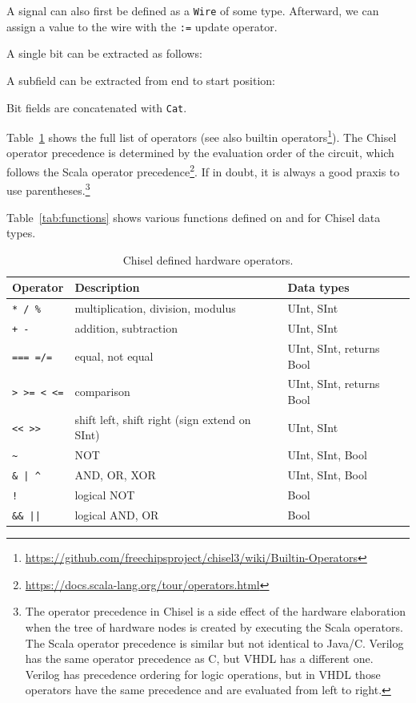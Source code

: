 \documentclass[%
    10pt,
    headinclude, footexclude,
    openright, %
    notitlepage,
    cleardoubleempty,
    headsepline,
    pointlessnumbers,
    bibtotoc, idxtotoc,
    ]{scrbook}
\newcommand{\code}[1]{{\small{\texttt{#1}}}}
\newcommand{\myref}[2]{\href{#1}{#2}}
\renewcommand{\myref}[2]{{#2}{\footnote{\url{#1}}}}
\begin{document}
A signal can also first be defined as a \code{Wire} of some type. Afterward, we can assign a
value to the wire with the \code{:=} update operator.


A single bit can be extracted as follows:

\noindent A subfield can be extracted from end to start position:

\noindent Bit fields are concatenated with \code{Cat}.

Table~\ref{tab:operators} shows the full list of operators
(see also \myref{https://github.com/freechipsproject/chisel3/wiki/Builtin-Operators}{builtin operators}).
The Chisel operator precedence is determined by the evaluation order of the circuit,
which follows the \myref{https://docs.scala-lang.org/tour/operators.html}{Scala operator precedence}.
If in doubt, it is always a good praxis to use parentheses.\footnote{The operator precedence in
Chisel is a side effect of the hardware elaboration when the tree of hardware nodes
is created by executing the Scala operators. The Scala operator precedence is similar but
not identical to Java/C. Verilog has the same operator precedence as C, but VHDL
has a different one. Verilog has precedence ordering for logic operations, but in VHDL
those operators have the same precedence and are evaluated from left to right.}

Table~\ref{tab:functions} shows various functions defined on and for Chisel data types.

\begin{table}
 \centering
 \label{tab:operators}
  \begin{tabular}{lll}
    \toprule
    Operator & Description & Data types \\
    \midrule
    \code{* / \%} & multiplication, division, modulus & UInt, SInt \\
    \code{+ -} & addition, subtraction & UInt, SInt \\
    \code{=== =/=} & equal, not equal & UInt, SInt, returns Bool \\
    \code{> >= < <=} & comparison & UInt, SInt, returns Bool \\
    \code{<< >>} & shift left, shift right (sign extend on SInt) & UInt, SInt \\
    \code{\~} & NOT & UInt, SInt, Bool \\
    \code{\& | \^} & AND, OR, XOR & UInt, SInt, Bool \\
    \code{!} & logical NOT & Bool \\
    \code{\&\& ||} & logical AND, OR & Bool \\
    \bottomrule 
  \end{tabular} 
  \caption{Chisel defined hardware operators.}
\end{table}
\end{document}
